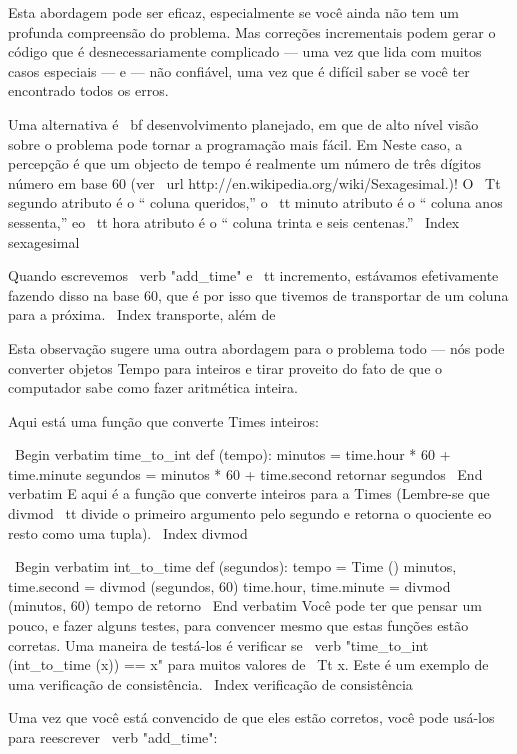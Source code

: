 \documentclass[10pt]{book}
\begin{document}
\begin {itemize}
{{{{{{{{{{{{{{Esta abordagem pode ser eficaz, especialmente se você ainda não tem um
profunda compreensão do problema. Mas correções incrementais podem
gerar o código que é desnecessariamente complicado --- uma vez que lida com
muitos casos especiais --- e --- não confiável, uma vez que é difícil saber se você
ter encontrado todos os erros.

Uma alternativa é {\ bf desenvolvimento planejado}, em que de alto nível
visão sobre o problema pode tornar a programação mais fácil. Em
Neste caso, a percepção é que um objecto de tempo é realmente um número de três dígitos
número em base 60 (ver \ url {http://en.wikipedia.org/wiki/Sexagesimal}.)! O
{\ Tt} segundo atributo é o `` coluna queridos,'' o {\ tt minuto}
atributo é o `` coluna anos sessenta,'' eo {\ tt hora} atributo é
o `` coluna trinta e seis centenas.''
\ Index {sexagesimal}

Quando escrevemos \ verb "add_time" e {\ tt incremento}, estávamos efetivamente
fazendo disso na base 60, que é por isso que tivemos de transportar de um
coluna para a próxima.
\ Index {transporte, além de}

Esta observação sugere uma outra abordagem para o problema todo --- nós
pode converter objetos Tempo para inteiros e tirar proveito do fato de
que o computador sabe como fazer aritmética inteira.  

Aqui está uma função que converte Times inteiros:

\ Begin {verbatim}
time_to_int def (tempo):
    minutos = time.hour * 60 + time.minute
    segundos = minutos * 60 + time.second
    retornar segundos
\ End {verbatim}
%
E aqui é a função que converte inteiros para a Times
(Lembre-se que {divmod \ tt} divide o primeiro argumento pelo segundo
e retorna o quociente eo resto como uma tupla).
\ Index {} divmod

\ Begin {verbatim}
int_to_time def (segundos):
    tempo = Time ()
    minutos, time.second = divmod (segundos, 60)
    time.hour, time.minute = divmod (minutos, 60)
    tempo de retorno
\ End {verbatim}
%
Você pode ter que pensar um pouco, e fazer alguns testes, para convencer
mesmo que estas funções estão corretas. Uma maneira de testá-los é
verificar se \ verb "time_to_int (int_to_time (x)) == x" para muitos valores de
{\ Tt x}. Este é um exemplo de uma verificação de consistência.
\ Index {verificação de consistência}

Uma vez que você está convencido de que eles estão corretos, você pode usá-los para 
reescrever \ verb "add_time":

}}}}}}}}}}}}}}
\end{itemize}
\end{document}

